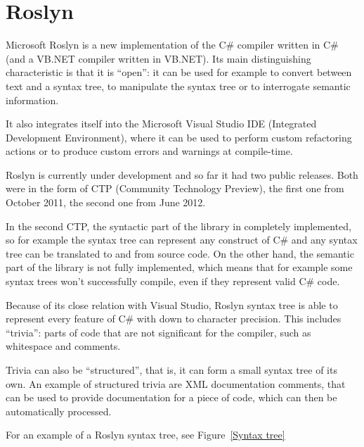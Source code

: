 \section{Roslyn}

Microsoft Roslyn is a new implementation of the C\# compiler written in C\#
(and a VB.NET compiler written in VB.NET).
Its main distinguishing characteristic is that it is “open”:
it can be used for example to convert between text and a syntax tree,
to manipulate the syntax tree or to interrogate semantic information.

It also integrates itself into the Microsoft Visual Studio IDE
(Integrated Development Environment), where it can be used to perform
custom refactoring actions or to produce custom errors and warnings at compile-time.

Roslyn is currently under development and so far it had two public releases.
Both were in the form of CTP (Community Technology Preview),
the first one from October 2011, the second one from June 2012.

In the second CTP, the syntactic part of the library in completely implemented,
so for example the syntax tree can represent any construct of C\#
and any syntax tree can be translated to and from source code.
On the other hand, the semantic part of the library is not fully implemented,
which means that for example some syntax trees won't successfully compile,
even if they represent valid C\# code.

Because of its close relation with Visual Studio,
Roslyn syntax tree is able to represent every feature of C\# with down to character precision.
This includes “trivia”: parts of code that are not significant for the compiler,
such as whitespace and comments.

Trivia can also be “structured”, that is, it can form a small syntax tree of its own.
An example of structured trivia are XML documentation comments,
that can be used to provide documentation for a piece of code,
which can then be automatically processed.

For an example of a Roslyn syntax tree, see Figure~\ref{Syntax tree}

